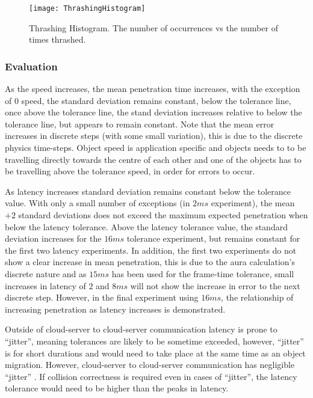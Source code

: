 \begin{figure}[t]
	\centering
	\texttt{[image: ThrashingHistogram]}
	\caption{Thrashing Histogram. The number of occurrences vs the number of times thrashed.}
	\label{fig_ThrashingHistogram}
\end{figure}


\subsubsection{Evaluation}
As the speed increases, the mean penetration time increases, with the exception of 0 speed, the standard deviation remains constant, below the tolerance line, once above the tolerance line, the stand deviation increases relative to below the tolerance line, but appears to remain constant. Note that the mean error increases in discrete steps (with some small variation), this is due to the discrete physics time-steps. Object speed is application specific and objects needs to to be travelling directly towards the centre of each other and one of the objects has to be travelling above the tolerance speed, in order for errors to occur.

As latency increases standard deviation remains constant below the tolerance value. With only a small number of exceptions (in $2ms$ experiment), the mean $+2$ standard deviations does not exceed the maximum expected penetration when below the latency tolerance. Above the latency tolerance value, the standard deviation increases for the $16ms$ tolerance experiment, but remains constant for the first two latency experiments. In addition, the first two experiments do not show a clear increase in mean penetration, this is due to the aura calculation's discrete nature and as $15ms$ has been used for the frame-time tolerance, small increases in latency of $2$ and $8ms$ will not show the increase in error to the next discrete step. However, in the final experiment using $16ms$, the relationship of increasing penetration as latency increases is demonstrated.

Outside of cloud-server to cloud-server communication latency is prone to ``jitter'', meaning tolerances are likely to be sometime exceeded, however, ``jitter'' is for short durations and would need to take place at the same time as an object migration. However, cloud-server to cloud-server communication has negligible ``jitter'' \cite{ThousandEyesCloudPerf2018}. If collision correctness is required even in cases of ``jitter'', the latency tolerance would need to be higher than the peaks in latency. 

